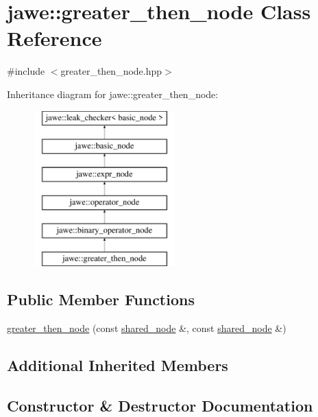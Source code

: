 \hypertarget{classjawe_1_1greater__then__node}{}\section{jawe\+:\+:greater\+\_\+then\+\_\+node Class Reference}
\label{classjawe_1_1greater__then__node}


{\ttfamily \#include $<$greater\+\_\+then\+\_\+node.\+hpp$>$}

Inheritance diagram for jawe\+:\+:greater\+\_\+then\+\_\+node\+:\begin{figure}[H]
\begin{center}
\leavevmode
\includegraphics[height=6.000000cm]{classjawe_1_1greater__then__node}
\end{center}
\end{figure}
\subsection*{Public Member Functions}
\begin{DoxyCompactItemize}
\item 
\hyperlink{classjawe_1_1greater__then__node_a448febc3164d39a1666a93c185c3c986}{greater\+\_\+then\+\_\+node} (const \hyperlink{namespacejawe_a3f307481d921b6cbb50cc8511fc2b544}{shared\+\_\+node} \&, const \hyperlink{namespacejawe_a3f307481d921b6cbb50cc8511fc2b544}{shared\+\_\+node} \&)
\end{DoxyCompactItemize}
\subsection*{Additional Inherited Members}


\subsection{Constructor \& Destructor Documentation}
\mbox{\label{classjawe_1_1greater__then__node_a448febc3164d39a1666a93c185c3c986}} 
